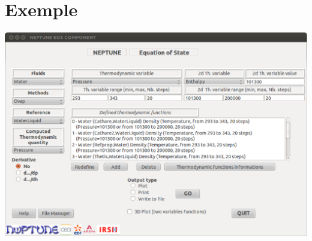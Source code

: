 \documentclass[10pt,a4paper]{article}
\begin{document}
\section{Exemple}

\begin{center}\includegraphics[width=20cm,angle=90]{CaptureEOS.eps}\end{center}
\end{document}
